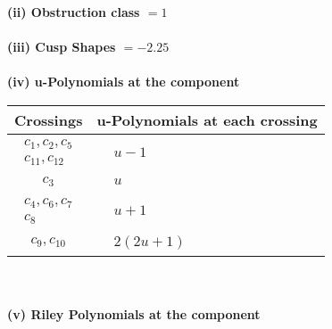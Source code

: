 \documentclass[1p]{elsarticle_modified}
\theoremstyle{definition}
\begin{document}
\flushleft \textbf{(ii) Obstruction class $= 1$}\\~\\
\flushleft \textbf{(iii) Cusp Shapes $= -2.25$}\\~\\
\newpage\renewcommand{\arraystretch}{1}
\flushleft \textbf{(iv) u-Polynomials at the component}\newline \\
\begin{tabular}{m{50pt}|m{274pt}}
Crossings & \hspace{64pt}u-Polynomials at each crossing \\
\hline $$\begin{aligned}c_{1},c_{2},c_{5}\\c_{11},c_{12}\end{aligned}$$&$\begin{aligned}
&u-1
\end{aligned}$\\
\hline $$\begin{aligned}c_{3}\end{aligned}$$&$\begin{aligned}
&u
\end{aligned}$\\
\hline $$\begin{aligned}c_{4},c_{6},c_{7}\\c_{8}\end{aligned}$$&$\begin{aligned}
&u+1
\end{aligned}$\\
\hline $$\begin{aligned}c_{9},c_{10}\end{aligned}$$&$\begin{aligned}
&2(2 u+1)
\end{aligned}$\\
\hline
\end{tabular}\\~\\
\newpage\renewcommand{\arraystretch}{1}
\flushleft \textbf{(v) Riley Polynomials at the component}\newline \\
\end{document}
